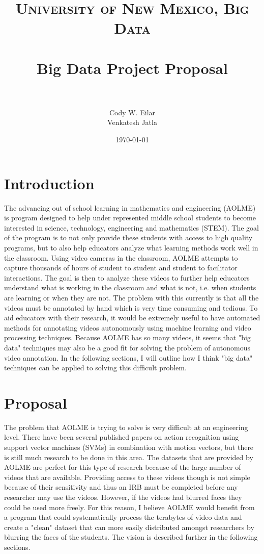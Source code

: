 \documentclass[paper=a4, fontsize=11pt]{scrartcl} %
\title{	
\normalfont \normalsize 
\textsc{University of New Mexico, Big Data} \\ [25pt] %
\horrule{0.5pt} \\[0.4cm] %
\huge Big Data Project Proposal \\ %
\horrule{2pt} \\[0.5cm] %
}
\author{Cody W. Eilar\\ 
Venkatesh Jatla
}
\date{\normalsize\today}
\numberwithin{equation}{section} %
\numberwithin{figure}{section} %
\numberwithin{table}{section} %
\begin{document}
\maketitle
\thispagestyle{empty}
\section{Introduction}
The advancing out of school learning in mathematics and engineering (AOLME) is program designed to help under 
represented middle school students to become interested in science, technology, engineering and mathematics (STEM). The goal of
the program is to not only provide these students with access to high quality programs, but to also help educators analyze
what learning methods work well in the classroom. Using video cameras in the classroom, AOLME attempts to capture 
thousands of hours of student to student and student to facilitator interactions. The goal is then to analyze these videos
to further help educators understand what is working in the classroom and what is not, i.e. when students are learning or when they are not. The problem with this currently is that
all the videos must be annotated by hand which is very time consuming and tedious. To aid educators with their research, 
it would be extremely useful to have automated methods for annotating videos autonomously using machine learning and 
video processing techniques. Because AOLME has so many videos, it seems that "big data" techniques may also be a
good fit for solving the problem of autonomous video annotation. In the following sections, I will outline how I think
"big data" techniques can be applied to solving this difficult problem. 

\section{Proposal}
The problem that AOLME is trying to solve is very difficult at an engineering level. There have been several published
papers on action recognition using support vector machines (SVMs) in combination with motion vectors, but there is still
much research to be done in this area. The datasets that are provided by AOLME are perfect for this type of research because
of the large number of videos that are available. Providing access to these videos though is not simple because of their 
sensitivity and thus an IRB must be completed before any researcher may use the videos. However, if the videos had blurred 
faces they could be used more freely. For this reason, I believe AOLME would benefit from a program that could systematically 
process the terabytes of video data and create a "clean" dataset that can more easily distributed amongst researchers by 
blurring the faces of the students. The vision is described further in the following sections. 
\end{document}
